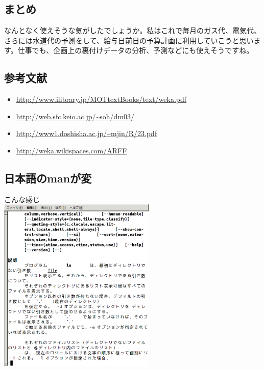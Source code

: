 \documentclass[mingoth,a4paper]{jsarticle}
\begin{document}
\subsection{まとめ}

なんとなく使えそうな気がしたでしょうか。私はこれで毎月のガス代、電気代、
さらには水道代の予測をして、給与日前日の予算計画に利用していこうと思いま
す。仕事でも、企画上の裏付けデータの分析、予測などにも使えそうですね。

\subsection{参考文献}
\begin{itemize}
 \item \url{http://www.ilibrary.jp/MOTtextBooks/text/weka.pdf}
 \item \url{http://web.sfc.keio.ac.jp/~soh/dm03/}
 \item \url{http://www1.doshisha.ac.jp/~mjin/R/23.pdf}
 \item \url{http://weka.wikispaces.com/ARFF}
\end{itemize}


\subsection{日本語のmanが変}

こんな感じ\\
\includegraphics[width=75mm]{image201003/manls.eps}
\end{document}
